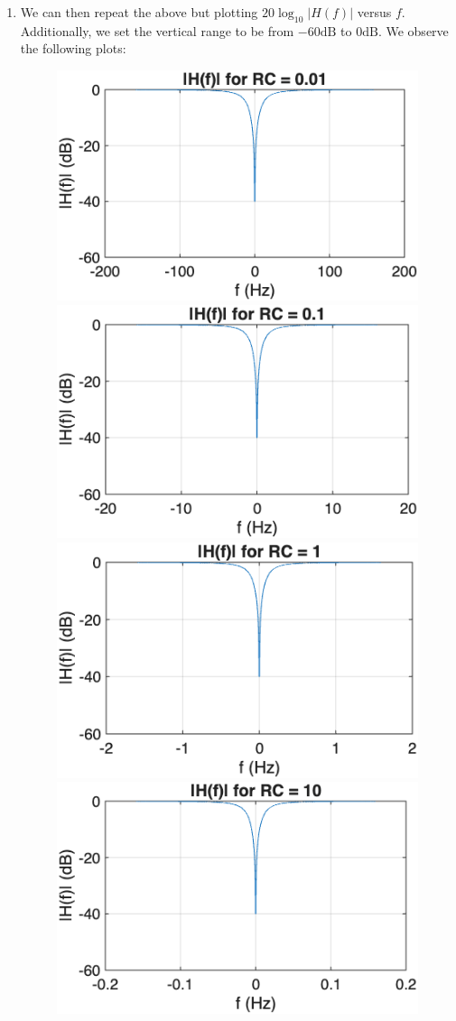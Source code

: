 \documentclass[11pt]{article}
\begin{document}
\begin{enumerate}[label=\textbf{\alph*)}, leftmargin=2.6em]
    \item We can then repeat the above but plotting $20\log_{10} |H(f)|$ versus $f$.
    Additionally, we set the vertical range to be from $-60\text{dB}$ to $0\text{dB}$. We observe the following plots:
    \begin{figure} [H]
        \centering
        \includegraphics[width=0.4\linewidth]{plot6.png}
        \includegraphics[width=0.4\linewidth]{plot7.png}
        \includegraphics[width=0.4\linewidth]{plot8.png}
        \includegraphics[width=0.4\linewidth]{plot9.png}
    \end{figure}

\end{enumerate}
\end{document}
